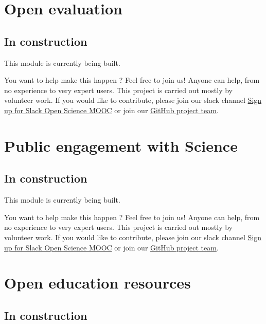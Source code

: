 \documentclass[]{book}
\begin{document}
\hypertarget{module7}{%
\chapter{Open evaluation}\label{module7}}

\hypertarget{in-construction-4}{%
\section{In construction}\label{in-construction-4}}

This module is currently being built.

You want to help make this happen ? Feel free to join us! Anyone can help, from no experience to very expert users. This project is carried out mostly by volunteer work. If you would like to contribute, please join our slack channel \href{https://osmooc.herokuapp.com/}{Sign up for Slack Open Science MOOC} or join our \href{https://open-science-mooc-invite.herokuapp.com/}{GitHub project team}.

\hypertarget{module8}{%
\chapter{Public engagement with Science}\label{module8}}

\hypertarget{in-construction-5}{%
\section{In construction}\label{in-construction-5}}

This module is currently being built.

You want to help make this happen ? Feel free to join us! Anyone can help, from no experience to very expert users. This project is carried out mostly by volunteer work. If you would like to contribute, please join our slack channel \href{https://osmooc.herokuapp.com/}{Sign up for Slack Open Science MOOC} or join our \href{https://open-science-mooc-invite.herokuapp.com/}{GitHub project team}.

\hypertarget{module9}{%
\chapter{Open education resources}\label{module9}}

\hypertarget{in-construction-6}{%
\section{In construction}\label{in-construction-6}}
\end{document}
